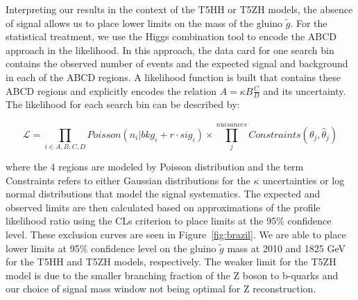 Interpreting our results in the context of the T5HH or T5ZH models, the absence of signal allows us to place lower limits on the mass of the gluino $\tilde{g}$. For the statistical treatment, we use the Higgs combination tool to encode the ABCD approach in the likelihood. In this approach, the data card for one search bin contains the observed number of events and the expected signal and background in each of the ABCD regions. A likelihood function is built that contains these ABCD regions and explicitly encodes the relation $A=\kappa B \frac{C}{D}$ and its uncertainty. The likelihood for each search bin can be described by:

\begin{equation}
\mathcal{L}=\prod_{i\in A,B,C,D} Poisson\left(n_i \vert bkg_i + r\cdot sig_i\right) \times \prod^{nuisances}_j Constraints\left(\theta_j , \hat{\theta}_j\right)
\end{equation}

where the 4 regions are modeled by Poisson distribution and the term Constraints refers to either Gaussian distributions for the $\kappa$ uncertainties or log normal distributions that model the signal systematics. The expected and observed limits are then calculated based on approximations of the profile likelihood ratio using the CLs criterion to place limits at the $95\%$ confidence level. These exclusion curves are seen in Figure~\ref{fig:brazil}. We are able to place lower limits at 95\% confidence level on the gluino $\tilde{g}$ mass at 2010 and 1825 GeV for the T5HH and T5ZH models, respectively. The weaker limit for the T5ZH model is due to the smaller branching fraction of the Z boson to b-quarks and our choice of signal mass window not being optimal for Z reconstruction.


